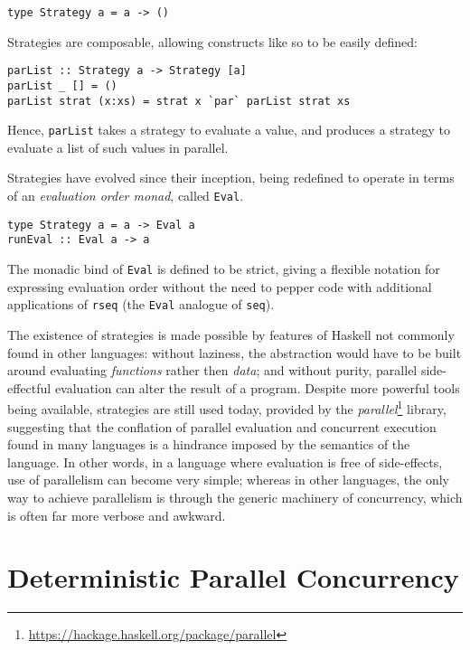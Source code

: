 \begin{verbatim}
type Strategy a = a -> ()
\end{verbatim}

Strategies are composable, allowing constructs like so to be easily
defined:

\begin{verbatim}
parList :: Strategy a -> Strategy [a]
parList _ [] = ()
parList strat (x:xs) = strat x `par` parList strat xs
\end{verbatim}

Hence, \verb|parList| takes a strategy to evaluate a value, and
produces a strategy to evaluate a list of such values in
parallel.

Strategies have evolved since their inception, being redefined to
operate in terms of an \textit{evaluation order
  monad}\cite{strategies}, called \verb|Eval|.

\begin{verbatim}
type Strategy a = a -> Eval a
runEval :: Eval a -> a
\end{verbatim}

The monadic bind of \verb|Eval| is defined to be strict, giving a
flexible notation for expressing evaluation order without the need to
pepper code with additional applications of \verb|rseq| (the
\verb|Eval| analogue of \verb|seq|).

The existence of strategies is made possible by features of Haskell
not commonly found in other languages: without laziness, the
abstraction would have to be built around evaluating
\textit{functions} rather then \textit{data}; and without purity,
parallel side-effectful evaluation can alter the result of a
program. Despite more powerful tools being available, strategies are
still used today, provided by the
\textit{parallel}\footnote{\url{https://hackage.haskell.org/package/parallel}}
library, suggesting that the conflation of parallel evaluation and
concurrent execution found in many languages is a hindrance imposed by
the semantics of the language. In other words, in a language where
evaluation is free of side-effects, use of parallelism can become very
simple; whereas in other languages, the only way to achieve
parallelism is through the generic machinery of concurrency, which is
often far more verbose and awkward.

\section{Deterministic Parallel Concurrency}
\label{sec:litrev-det}

